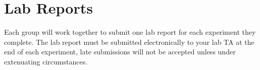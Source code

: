 %

\section*{Lab Reports}
Each group will work together to submit one lab report for each experiment they complete.
The lab report must be submitted electronically to your lab TA at the end of each experiment, late submissions will not be accepted unless under extenuating circumstances.


